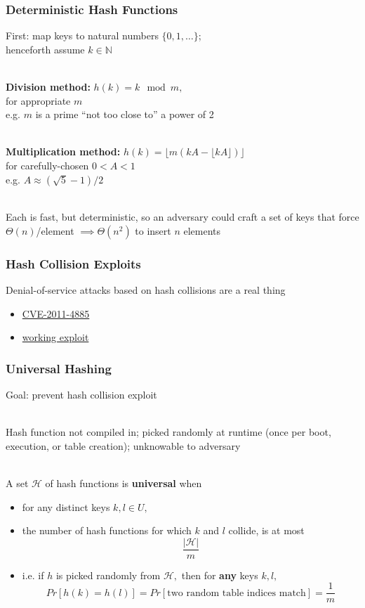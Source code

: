 \documentclass{beamer}
\newcommand{\stanza}{ \\~\ }
\begin{document}
\begin{frame} \frametitle{Deterministic Hash Functions}
First: map keys to natural numbers $\{0, 1, \ldots \}$; \\
henceforth assume $k \in \mathbb{N}$ \stanza

\textbf{Division method:} $h(k) = k \mod m,$ \\
for appropriate $m$ \\
e.g. $m$ is a prime ``not too close to'' a power of 2 \stanza

\textbf{Multiplication method:} $h(k) = \big\lfloor m(kA - \lfloor kA \rfloor) \big\rfloor$ \\
for carefully-chosen $0<A<1$ \\
e.g. $A \approx (\sqrt{5} -1)/2$ \stanza

Each is fast, but deterministic, so an adversary could craft a set of keys
that force $\Theta(n)$/element $\implies \Theta(n^2)$ to insert $n$ elements
\end{frame}

\begin{frame} \frametitle{Hash Collision Exploits}
Denial-of-service attacks based on hash collisions are a real thing
\begin{itemize}
  \item \href{https://nvd.nist.gov/vuln/detail/CVE-2011-4885}{CVE-2011-4885}
  \item \href{https://www.exploit-db.com/exploits/18305}{working exploit}
\end{itemize}
\end{frame}

\begin{frame} \frametitle{Universal Hashing}
Goal: prevent hash collision exploit \stanza

Hash function not compiled in; picked randomly at runtime (once per boot,
execution, or table creation); unknowable to adversary \stanza

A set $\mathcal{H}$ of hash functions is \textbf{universal} when
\begin{itemize}
  \item for any distinct keys $k, l \in U,$
  \item the number of hash functions for which $k$ and $l$ collide,
    is at most
    \[ \frac{|\mathcal{H}|}{m} \]
  \item i.e. if $h$ is picked randomly from $\mathcal{H},$ then for \textbf{any} keys $k,l,$
    \[ Pr[h(k)=h(l)] = Pr[\text{two random table indices match}] = \frac{1}{m} \]
\end{itemize}
\end{frame}
\end{document}
